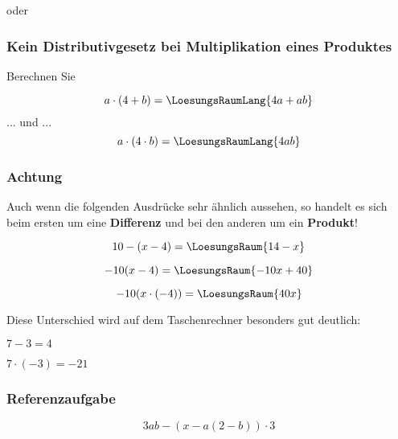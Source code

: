 \begin{beispiel}{}{}
oder \TRAINER{\\}
\end{beispiel}

\subsubsection{Kein Distributivgesetz bei Multiplikation eines Produktes}
Berechnen Sie

$$a\cdot{}(4+b) = \LoesungsRaumLang{4a + ab}$$
 ... und ...
$$ a\cdot{}(4\cdot{}b) = \LoesungsRaumLang{4ab} $$

\newpage

\subsubsection{Achtung}
Auch wenn die folgenden Ausdrücke sehr ähnlich aussehen, so
handelt es sich beim ersten um eine \textbf{Differenz} und bei den anderen um
ein \textbf{Produkt}!

$$10-(x-4) =\LoesungsRaum{14-x}$$

$$-10(x-4) = \LoesungsRaum{-10x + 40}$$

$$-10(x\cdot{}(-4)) = \LoesungsRaum{40x}$$

Diese Unterschied wird auf dem Taschenrechner besonders gut deutlich:

    $ 7 - 3 = 4$

\vspace{3mm}
   $ 7\cdot{}(-3) = -21$


\subsubsection{Referenzaufgabe}
$$3ab-(x-a(2-b))\cdot{}3$$

\newpage

